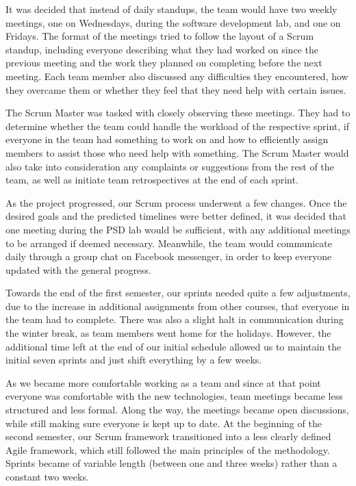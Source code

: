 \documentclass{l3proj}
\begin{document}
 It was decided that instead of daily standups, the team would have two weekly
  meetings, one on Wednesdays, during the software development lab, and one on
  Fridays. The format of the meetings tried to follow the layout of a Scrum standup,
  including everyone describing what they had worked on since the previous meeting and 
  the work they planned on completing before the next meeting. Each team member 
  also discussed any difficulties they encountered, how they overcame them or 
  whether they feel that they need help with certain issues.

 The Scrum Master was tasked with closely observing these meetings. They had
  to determine whether the team could handle the workload of the respective
  sprint, if everyone in the team had something to work on and how to efficiently
  assign members to assist those who need help with something. The Scrum
  Master would also take into consideration any complaints or suggestions from
  the rest of the team, as well as initiate team retrospectives at the end of
  each sprint.

 As the project progressed, our Scrum process underwent a few changes. Once
 the desired goals and the predicted timelines were better defined, it was
 decided that one meeting during the PSD lab would be sufficient, with any
 additional meetings to be arranged if deemed necessary. Meanwhile, the team
 would communicate daily through a group chat on Facebook messenger, in order
 to keep everyone updated with the general progress.

Towards the end of the first semester, our sprints needed quite a few
 adjustments, due to the increase in additional assignments from other
 courses, that everyone in the team had to complete. There was also a
 slight halt in communication during the winter break, as team members
 went home for the holidays. However, the additional time left at the
 end of our initial schedule allowed us to maintain the initial seven
 sprints and just shift everything by a few weeks.

As we became more comfortable working as a team and since at that
 point everyone was comfortable with the new technologies, team
 meetings became less structured and less formal. Along the way,
 the meetings became open discussions, while still making sure
 everyone is kept up to date. At the beginning of the second
 semester, our Scrum framework transitioned into a less clearly
 defined Agile framework, which still followed the main principles
 of the methodology. Sprints became of variable length (between
 one and three weeks) rather than a constant two weeks.
\end{document}
